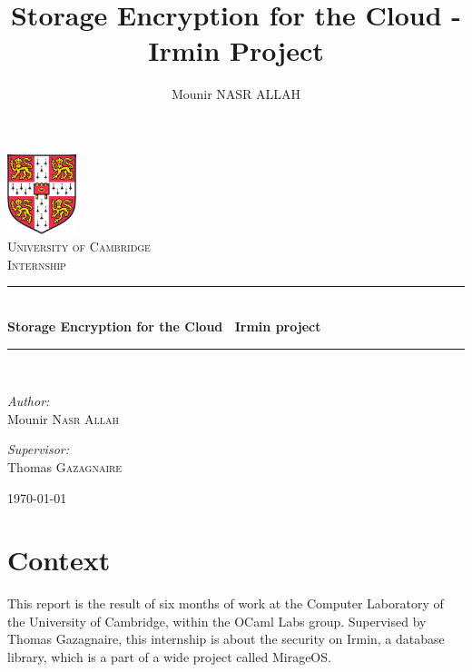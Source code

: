 \documentclass[10pt,a4paper]{report}
\author{Mounir NASR ALLAH}
\title{Storage Encryption for the Cloud - Irmin Project}
\newcommand{\HRule}{\rule{\linewidth}{0.5mm}}
\begin{document}
\begin{titlepage}
\begin{center}


\includegraphics[width=0.15\textwidth]{./img/university_of_cambridge.png}~\\[1cm]

\textsc{\LARGE University of Cambridge}\\[1.5cm]

\textsc{\Large Internship }\\[0.5cm]

\HRule \\[0.4cm]
{ \huge \bfseries Storage Encryption for the Cloud \ Irmin project\\[0.4cm] }

\HRule \\[1.5cm]

\noindent
\begin{minipage}{0.4\textwidth}
\begin{flushleft} \large
\emph{Author:}\\
Mounir \textsc{Nasr Allah}
\end{flushleft}
\end{minipage}%
\begin{minipage}{0.4\textwidth}
\begin{flushright} \large
\emph{Supervisor:} \\
Thomas \textsc{Gazagnaire}
\end{flushright}
\end{minipage}

\vfill

{\large \today}

\end{center}
\end{titlepage}

\tableofcontents


\chapter{Context}
This report is the result of six months of work at the Computer Laboratory of the University of Cambridge, within the OCaml Labs group. 
Supervised by Thomas Gazagnaire, this internship is about the security on Irmin, a database library, which is a part of a wide project called MirageOS. 
\end{document}
